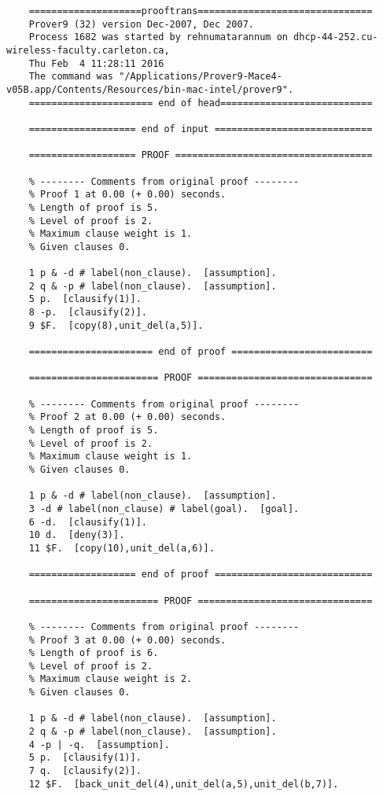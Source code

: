 \documentclass{article}
\begin{document}
\begin{enumerate}
\begin{description}
    \begin{verbatim}
    ====================prooftrans===============================
    Prover9 (32) version Dec-2007, Dec 2007.
    Process 1682 was started by rehnumatarannum on dhcp-44-252.cu-wireless-faculty.carleton.ca,
    Thu Feb  4 11:28:11 2016
    The command was "/Applications/Prover9-Mace4-v05B.app/Contents/Resources/bin-mac-intel/prover9".
    ====================== end of head===========================

    =================== end of input ============================

    =================== PROOF ===================================

    % -------- Comments from original proof --------
    % Proof 1 at 0.00 (+ 0.00) seconds.
    % Length of proof is 5.
    % Level of proof is 2.
    % Maximum clause weight is 1.
    % Given clauses 0.

    1 p & -d # label(non_clause).  [assumption].
    2 q & -p # label(non_clause).  [assumption].
    5 p.  [clausify(1)].
    8 -p.  [clausify(2)].
    9 $F.  [copy(8),unit_del(a,5)].

    ====================== end of proof =========================

    ======================= PROOF ===============================

    % -------- Comments from original proof --------
    % Proof 2 at 0.00 (+ 0.00) seconds.
    % Length of proof is 5.
    % Level of proof is 2.
    % Maximum clause weight is 1.
    % Given clauses 0.

    1 p & -d # label(non_clause).  [assumption].
    3 -d # label(non_clause) # label(goal).  [goal].
    6 -d.  [clausify(1)].
    10 d.  [deny(3)].
    11 $F.  [copy(10),unit_del(a,6)].

    =================== end of proof ============================

    ======================= PROOF ===============================

    % -------- Comments from original proof --------
    % Proof 3 at 0.00 (+ 0.00) seconds.
    % Length of proof is 6.
    % Level of proof is 2.
    % Maximum clause weight is 2.
    % Given clauses 0.

    1 p & -d # label(non_clause).  [assumption].
    2 q & -p # label(non_clause).  [assumption].
    4 -p | -q.  [assumption].
    5 p.  [clausify(1)].
    7 q.  [clausify(2)].
    12 $F.  [back_unit_del(4),unit_del(a,5),unit_del(b,7)].


\end{verbatim}
\end{description}
\end{enumerate}
\end{document}
